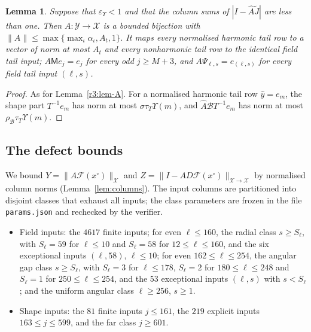 \documentclass[11pt]{amsart}
\newtheorem{lemma}[theorem]{Lemma}
\theoremstyle{definition}
\theoremstyle{remark}
\numberwithin{equation}{section}
\newcommand{\Fc}{\mathcal{F}}
\newcommand{\eps}{\varepsilon}
\newcommand{\nrm}[1]{\lVert #1\rVert}
\begin{document}
\begin{lemma}\label{r5:lem-A}
Suppose that $\eps_\Upsilon<1$ and that the column sums of $|I-\widehat A\widetilde J|$ are less than one. Then $A\colon\mathcal Y\to\mathcal X$ is a bounded bijection with $\nrm A\leq\max\{\max_\iota\alpha_\iota,A_t,1\}$. It maps every normalised harmonic tail row to a vector of norm at most $A_t$ and every nonharmonic tail row to the identical field tail input; $A\mathsf Me_j=e_j$ for every odd $j\geq M+3$, and $A\Psi_{\ell,s}=e_{(\ell,s)}$ for every field tail input $(\ell,s)$.
\end{lemma}

\begin{proof}
As for Lemma~\ref{r3:lem-A}. For a normalised harmonic tail row $\hat y=e_m$, the shape part $T^{-1}e_m$ has norm at most $\sigma\tau_T\Upsilon(m)$, and $\widehat A\mathcal BT^{-1}e_m$ has norm at most $\rho_{\mathcal B}\tau_T\Upsilon(m)$.
\end{proof}

\subsection{The defect bounds}\label{r5:sec-Z}

We bound $Y=\nrm{A\Fc(x^\circ)}_{\mathcal X}$ and $Z=\nrm{I-AD\Fc(x^\circ)}_{\mathcal X\to\mathcal X}$ by normalised column norms (Lemma~\ref{lem:columns}). The input columns are partitioned into disjoint classes that exhaust all inputs; the class parameters are frozen in the file \texttt{params.json} and rechecked by the verifier.
\begin{itemize}
\item Field inputs: the $4617$ finite inputs; for even $\ell\leq160$, the radial class $s\geq S_\ell$, with $S_\ell=59$ for $\ell\leq10$ and $S_\ell=58$ for $12\leq\ell\leq160$, and the six exceptional inputs $(\ell,58)$, $\ell\leq10$; for even $162\leq\ell\leq254$, the angular gap class $s\geq S_\ell$, with $S_\ell=3$ for $\ell\leq178$, $S_\ell=2$ for $180\leq\ell\leq248$ and $S_\ell=1$ for $250\leq\ell\leq254$, and the $53$ exceptional inputs $(\ell,s)$ with $s<S_\ell$; and the uniform angular class $\ell\geq256$, $s\geq1$.
\item Shape inputs: the $81$ finite inputs $j\leq161$, the $219$ explicit inputs $163\leq j\leq599$, and the far class $j\geq601$.
\end{itemize}
\end{document}
